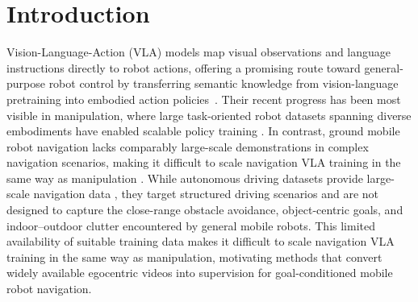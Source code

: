 \section{Introduction}
\label{sec:introduction}

Vision-Language-Action (VLA) models map visual observations and language instructions directly to robot actions, offering a promising route toward general-purpose robot control by transferring semantic knowledge from vision-language pretraining into embodied action policies~\cite{brohan2023rt2visionlanguageactionmodelstransfer,intelligence2025pi_,kim2024openvla,nvidia2025gr00tn1openfoundation}.
Their recent progress has been most visible in manipulation, where large task-oriented robot datasets spanning diverse embodiments have enabled scalable policy training \cite{intelligence2025pi_, o2024open, black2024pi_0, kawaharazuka2025vision, kim2024openvla}. 
In contrast, ground mobile robot navigation lacks comparably large-scale demonstrations in complex navigation scenarios, making it difficult to scale navigation VLA training in the same way as manipulation \cite{karnan2022scand, liang2025gndglobalnavigationdataset, shah2023gnm}.
While autonomous driving datasets provide large-scale navigation data \cite{caesar2020nuscenes, chang2019argoverse, sun2020scalability}, they target structured driving scenarios and are not designed to capture the close-range obstacle avoidance, object-centric goals, and indoor--outdoor clutter encountered by general mobile robots.
This limited availability of suitable training data makes it difficult to scale navigation VLA training in the same way as manipulation, motivating methods that convert widely available egocentric videos into supervision for goal-conditioned mobile robot navigation.


